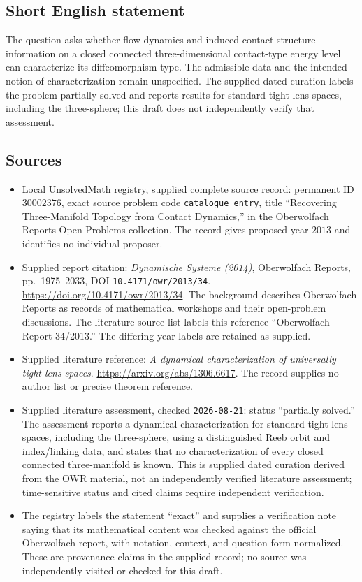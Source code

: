 \documentclass[11pt]{article}
\begin{document}
\subsection{Short English statement}
The question asks whether flow dynamics and induced contact-structure information on a closed connected three-dimensional contact-type energy level can characterize its diffeomorphism type. The admissible data and the intended notion of characterization remain unspecified. The supplied dated curation labels the problem partially solved and reports results for standard tight lens spaces, including the three-sphere; this draft does not independently verify that assessment.
\subsection{Sources}
\begin{itemize}
\item Local UnsolvedMath registry, supplied complete source record: permanent ID \(30002376\), exact source problem code \texttt{catalogue entry}, title ``Recovering Three-Manifold Topology from Contact Dynamics,'' in the Oberwolfach Reports Open Problems collection. The record gives proposed year \(2013\) and identifies no individual proposer.
\item Supplied report citation: \emph{Dynamische Systeme (2014)}, Oberwolfach Reports, pp.\ 1975--2033, DOI \texttt{10.4171/owr/2013/34}. \url{https://doi.org/10.4171/owr/2013/34}. The background describes Oberwolfach Reports as records of mathematical workshops and their open-problem discussions. The literature-source list labels this reference ``Oberwolfach Report 34/2013.'' The differing year labels are retained as supplied.
\item Supplied literature reference: \emph{A dynamical characterization of universally tight lens spaces}. \url{https://arxiv.org/abs/1306.6617}. The record supplies no author list or precise theorem reference.
\item Supplied literature assessment, checked \texttt{2026-08-21}: status ``partially solved.'' The assessment reports a dynamical characterization for standard tight lens spaces, including the three-sphere, using a distinguished Reeb orbit and index/linking data, and states that no characterization of every closed connected three-manifold is known. This is supplied dated curation derived from the OWR material, not an independently verified literature assessment; time-sensitive status and cited claims require independent verification.
\item The registry labels the statement ``exact'' and supplies a verification note saying that its mathematical content was checked against the official Oberwolfach report, with notation, context, and question form normalized. These are provenance claims in the supplied record; no source was independently visited or checked for this draft.
\end{itemize}
\end{document}
